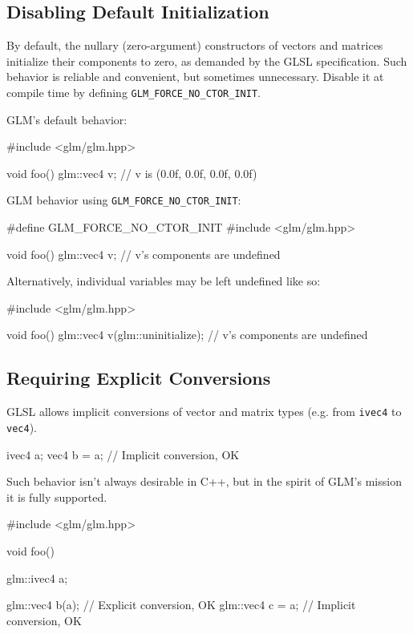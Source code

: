 \documentclass{scrartcl}
\numberwithin{figure}{subsection}
\begin{document}
\subsection{Disabling Default Initialization}

By default, the nullary (zero-argument) constructors of vectors and matrices initialize their components to zero, as demanded by the GLSL specification.  Such behavior is reliable and convenient, but sometimes unnecessary.  Disable it at compile time by defining \verb|GLM_FORCE_NO_CTOR_INIT|.

GLM's default behavior:

\begin{cppcode}
#include <glm/glm.hpp>

void foo()
{
  glm::vec4 v; // v is (0.0f, 0.0f, 0.0f, 0.0f)
}
\end{cppcode}

GLM behavior using \verb|GLM_FORCE_NO_CTOR_INIT|:

\begin{cppcode}
#define GLM_FORCE_NO_CTOR_INIT 
#include <glm/glm.hpp>

void foo()
{
  glm::vec4 v; // v's components are undefined
}
\end{cppcode}

Alternatively, individual variables may be left undefined like so:

\begin{cppcode}
#include <glm/glm.hpp>

void foo()
{
  glm::vec4 v(glm::uninitialize); // v's components are undefined
}
\end{cppcode}

\subsection{Requiring Explicit Conversions}

GLSL allows implicit conversions of vector and matrix types (e.g. from \verb|ivec4| to \verb|vec4|).

\begin{glslcode}
ivec4 a;
vec4 b = a; // Implicit conversion, OK
\end{glslcode}

Such behavior isn't always desirable in C++, but in the spirit of GLM's mission it is fully supported.

\begin{cppcode}
#include <glm/glm.hpp>

void foo()
{
  glm::ivec4 a;

  glm::vec4 b(a); // Explicit conversion, OK
  glm::vec4 c = a; // Implicit conversion, OK
}
\end{cppcode}
\end{document}

